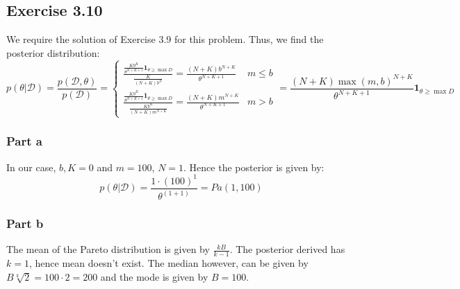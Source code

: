 \documentclass{article}
\begin{document}
\subsection*{Exercise 3.10}
\begin{flushleft}
We require the solution of Exercise 3.9 for this problem. Thus, we find the posterior distribution:
\begin{equation}
p(\theta | \mathcal{D}) = \frac{p(\mathcal{D, \theta})}{p(\mathcal{D})} =
\begin{cases}
\frac{\frac{Kb^{K}}{\theta^{N + K + 1}}\mathbf{1}_{\theta \geq \max{D}}}{\frac{K}{(N + K)b^{N}}} = \frac{(N + K)b^{N+K}}{\theta^{N + K + 1}}& m \leq b\\
\frac{\frac{Kb^{K}}{\theta^{N + K + 1}}\mathbf{1}_{\theta \geq \max{D}}}{\frac{Kb^{K}}{(N + K)m^{N + K}}} = \frac{(N + K)m^{N + K}}{\theta^{N + K + 1}} & m > b
\end{cases} = \frac{(N + K)\max(m, b)^{N + K}}{\theta^{N + K + 1}}\mathbf{1}_{\theta \geq \max{D}}
\end{equation}
\end{flushleft}

\subsubsection*{Part a}
\begin{flushleft}
In our case, \(b, K = 0\) and \(m = 100\), \(N = 1\). Hence the posterior is given by:
\begin{equation}
p(\theta | \mathcal{D}) = \frac{1\cdot(100)^{1}}{\theta^{(1 + 1)}} = Pa(1, 100)
\end{equation}
\end{flushleft}

\subsubsection*{Part b}
\begin{flushleft}
The mean of the Pareto distribution is given by \(\frac{kB}{k - 1}\). The posterior derived has \(k = 1\), hence mean doesn't exist. The median however, can be given by \(B\sqrt[k]{2} = 100 \cdot 2 = 200\) and the mode is given by \(B = 100\).
\end{flushleft}
\end{document}
